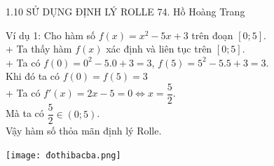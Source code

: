  \begin{frame}{1.10 SỬ DỤNG ĐỊNH LÝ ROLLE \hspace{4cm}  74. Hồ Hoàng Trang}
  \begin{minipage}{0.5\linewidth}
 \begin{block}{Ví dụ 1:}
     Cho hàm số $f(x)=x^2-5x+3$ trên đoạn $\left[0;5\right]$.\\
     \pause
     + Ta thấy hàm $f(x)$ xác định và liên tục trên $\left[0;5\right]$.\\
     \pause
     + Ta có $f(0)=0^2-5.0+3=3$, $f(5)=5^2-5.5+3=3$.\\ Khi đó ta có $f(0)=f(5)=3$\\
     \pause
     + Ta có $f'(x)=2x-5=0\Leftrightarrow x=\dfrac{5}{2}$.\\
     Mà ta có $\dfrac{5}{2} \in (0; 5)$.\\
     \pause
     Vậy hàm số thỏa mãn định lý Rolle.
 \end{block}
 
 \end{minipage}\qquad
 \begin{minipage}{0.4\linewidth}
			\texttt{[image: đothibacba.png]}
\end{minipage}
\end{frame}
